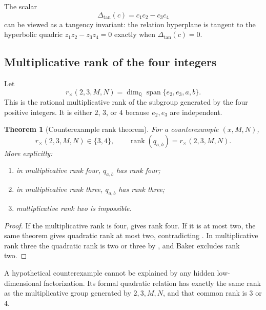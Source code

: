 \documentclass[11pt]{article}
\newtheorem{theorem}{Theorem}[section]
\theoremstyle{definition}
\theoremstyle{remark}
\newcommand{\Q}{\mathbb{Q}}
\newcommand{\Span}{\operatorname{span}}
\newcommand{\rank}{\operatorname{rank}}
\begin{document}
The scalar
\begin{equation}
 \Delta_{\mathrm{tan}}(c)=c_1c_2-c_3c_4
 \label{eq:tangent-invariant}
\end{equation}
can be viewed as a tangency invariant: the relation hyperplane is tangent to the hyperbolic
quadric $z_1z_2-z_3z_4=0$ exactly when $\Delta_{\mathrm{tan}}(c)=0$.

\subsection{Multiplicative rank of the four integers}

Let
\begin{equation}
 r_{\times}(2,3,M,N)
 =\dim_{\Q}\Span\{e_2,e_3,a,b\}.
 \label{eq:mult-rank}
\end{equation}
This is the rational multiplicative rank of the subgroup generated by the four positive
integers.  It is either $2$, $3$, or $4$ because $e_2,e_3$ are independent.

\begin{theorem}[Counterexample rank theorem]
\label{thm:counterexample-rank}
For a counterexample $(x,M,N)$,
\[
 r_{\times}(2,3,M,N)\in\{3,4\},
 \qquad
 \rank(q_{a,b})=r_{\times}(2,3,M,N).
\]
More explicitly:
\begin{enumerate}[label=\textup{(\alph*)}]
\item in multiplicative rank four, $q_{a,b}$ has rank four;
\item in multiplicative rank three, $q_{a,b}$ has rank three;
\item multiplicative rank two is impossible.
\end{enumerate}
\end{theorem}

\begin{proof}
If the multiplicative rank is four,  gives rank four.
If it is at most two, the same theorem gives quadratic rank at most two, contradicting
.  In multiplicative rank three the quadratic rank is two or
three by , and Baker excludes rank two.
\end{proof}

\begin{resultbox}
A hypothetical counterexample cannot be explained by any hidden low-dimensional
factorization.  Its formal quadratic relation has exactly the same rank as the
multiplicative group generated by $2,3,M,N$, and that common rank is $3$ or $4$.
\end{resultbox}
\end{document}
